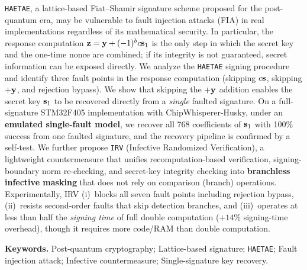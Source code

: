\texttt{HAETAE}, a lattice-based Fiat--Shamir signature scheme proposed for the
post-quantum era, may be vulnerable to fault injection attacks (FIA) in real
implementations regardless of its mathematical security. In particular, the response
computation $\mathbf{z}=\mathbf{y}+(-1)^b c\mathbf{s}_1$ is the only step in which the secret key and
the one-time nonce are combined; if its integrity is not guaranteed, secret information
can be exposed directly. We analyze the \texttt{HAETAE} signing procedure and identify
three fault points in the response computation (skipping $c\mathbf{s}$, skipping $+\mathbf{y}$, and
rejection bypass). We show that skipping the $+\mathbf{y}$ addition enables the secret key
$\mathbf{s}_1$ to be recovered directly from a \emph{single} faulted signature. On a
full-signature STM32F405 implementation with ChipWhisperer-Husky, under an
\textbf{emulated single-fault model}, we recover all 768 coefficients of $\mathbf{s}_1$ with
100\% success from one faulted signature, and the recovery pipeline is confirmed by a
self-test. We further propose \texttt{IRV}
(Infective Randomized Verification), a
lightweight countermeasure that unifies recomputation-based verification, signing-boundary
norm re-checking, and secret-key integrity checking into \textbf{branchless infective
masking} that does not rely on comparison (branch) operations. Experimentally, IRV
(i)~blocks all seven fault points including rejection bypass, (ii)~resists second-order
faults that skip detection branches, and (iii)~operates at less than half the
\emph{signing time} of full double computation ($+14\%$ signing-time overhead), though it
requires more code/RAM than double computation.

\smallskip
\noindent\textbf{Keywords.} Post-quantum cryptography; Lattice-based signature;
\texttt{HAETAE}; Fault injection attack; Infective countermeasure; Single-signature key recovery.
